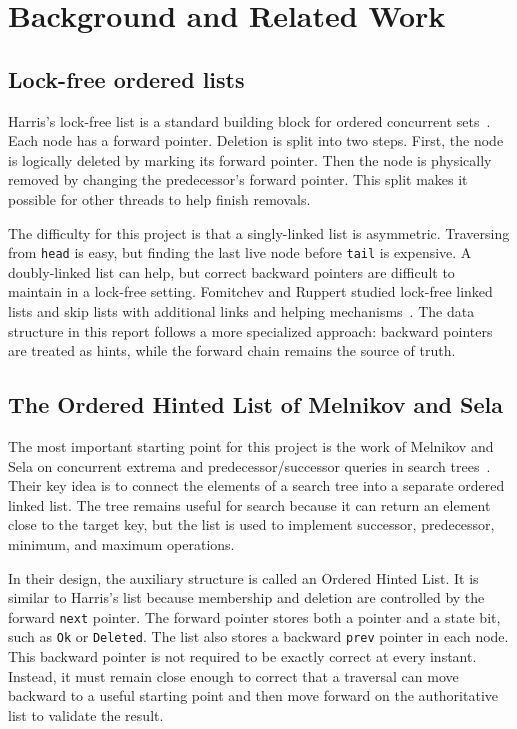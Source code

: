 \documentclass[a4paper,11pt]{article}
\newcommand{\code}[1]{\texttt{#1}}
\begin{document}
\section{Background and Related Work}

\subsection{Lock-free ordered lists}

Harris's lock-free list is a standard building block for ordered concurrent sets~\cite{harris2001pragmatic}. Each node has a forward pointer. Deletion is split into two steps. First, the node is logically deleted by marking its forward pointer. Then the node is physically removed by changing the predecessor's forward pointer. This split makes it possible for other threads to help finish removals.

The difficulty for this project is that a singly-linked list is asymmetric. Traversing from \code{head} is easy, but finding the last live node before \code{tail} is expensive. A doubly-linked list can help, but correct backward pointers are difficult to maintain in a lock-free setting. Fomitchev and Ruppert studied lock-free linked lists and skip lists with additional links and helping mechanisms~\cite{fomitchev2004lock}. The data structure in this report follows a more specialized approach: backward pointers are treated as hints, while the forward chain remains the source of truth.

\subsection{The Ordered Hinted List of Melnikov and Sela}

The most important starting point for this project is the work of Melnikov and Sela on concurrent extrema and predecessor/successor queries in search trees~\cite{melnikov2024hinted}. Their key idea is to connect the elements of a search tree into a separate ordered linked list. The tree remains useful for search because it can return an element close to the target key, but the list is used to implement successor, predecessor, minimum, and maximum operations.

In their design, the auxiliary structure is called an Ordered Hinted List. It is similar to Harris's list because membership and deletion are controlled by the forward \code{next} pointer. The forward pointer stores both a pointer and a state bit, such as \code{Ok} or \code{Deleted}. The list also stores a backward \code{prev} pointer in each node. This backward pointer is not required to be exactly correct at every instant. Instead, it must remain close enough to correct that a traversal can move backward to a useful starting point and then move forward on the authoritative list to validate the result.
\end{document}
